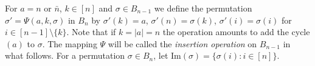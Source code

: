 \documentclass[12pt,reqno]{amsart}
\numberwithin{equation}{section}
\newcounter{num}
\def\Z{\mathbb{Z}}
\def\x{\mathbf{ x}}
\begin{document}
%
For $a=n$ or $\bar n$, $k\in [n]$  and $\sigma\in B_{n-1}$ 
we define 
the permutation $\sigma'=\Psi(a,k, \sigma)$ in $B_n$ by 
 $
\sigma'(k)=a$, $ \sigma'(n)=\sigma(k)$, $ \sigma'(i)=\sigma(i)$
 for $i\in [n-1]\setminus\{ k\}$.
 Note that if $k=|a|=n$  the operation amounts to add the cycle 
 $(a)$ to $\sigma$.
 The mapping $\Psi$ will be  called the \emph{insertion operation} on $B_{n-1}$ in what follows. 
 For a permutation $\sigma\in B_n$, let
$\mathrm{Im}(\sigma)=\{\sigma(i): i\in [n]\}$.

%


\end{document}
